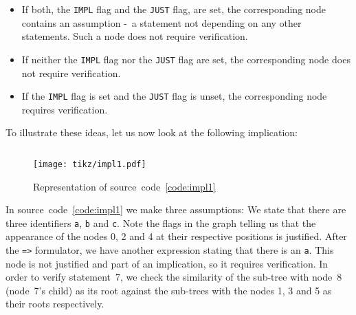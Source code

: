 \documentclass[british]{article}
\newenvironment{code}{\captionsetup{type=listing}}{}
\newcommand\prv{bc}
\newcommand\m[1]{\texttt{#1}}
\begin{document}
\begin{itemize}
	\item
		If both, the \texttt{IMPL} flag and the \texttt{JUST} flag, are set, the
		corresponding node contains an assumption -\ a statement not depending
		on any other statements. Such a node does not require verification.
	\item
		If neither the \texttt{IMPL} flag nor the \texttt{JUST} flag are set,
		the corresponding node does not require verification.
	\item
		If the \texttt{IMPL} flag is set and the \texttt{JUST} flag is unset,
		the corresponding node requires verification.
\end{itemize}

To illustrate these ideas, let us now look at the following implication:

\begin{code}
\label{code:impl1}
\inputminted[linenos]{\prv}{examples/impl1.prove}
\end{code}

\begin{figure}[!h]
\caption{Representation of source~code~\ref{code:impl1}}\label{fig:impl1}
\centering
\texttt{[image: tikz/impl1.pdf]}
\end{figure}


In source~code~\ref{code:impl1} we make three assumptions: We state that there
are three identifiers \m{a}, \m{b} and \m{c}. Note the flags in the graph
telling us that the appearance of the nodes 0, 2 and 4 at their respective
positions is justified.
After the \m{=>} formulator, we have another expression stating that there is an
\m{a}.  This node is not justified and part of an implication, so it requires
verification. In order to verify statement~7, we check the similarity of the
sub-tree with node~8 (node~7's child) as its root against the sub-trees with the
nodes 1, 3 and 5 as their roots respectively.
\end{document}
